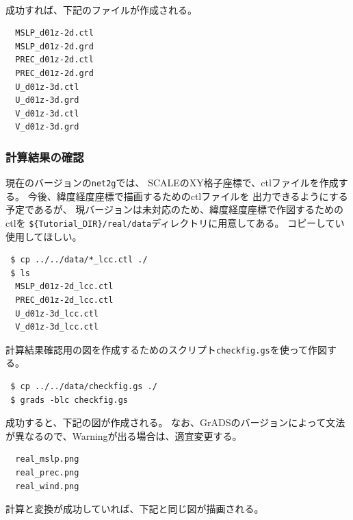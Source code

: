 \\

成功すれば、下記のファイルが作成される。
\begin{verbatim}
  MSLP_d01z-2d.ctl
  MSLP_d01z-2d.grd
  PREC_d01z-2d.ctl
  PREC_d01z-2d.grd
  U_d01z-3d.ctl
  U_d01z-3d.grd
  V_d01z-3d.ctl
  V_d01z-3d.grd
\end{verbatim}


\subsubsection{計算結果の確認}
現在のバージョンの\verb|net2g|では、
SCALEのXY格子座標で、ctlファイルを作成する。
今後、緯度経度座標で描画するためのctlファイルを
出力できるようにする予定であるが、
現バージョンは未対応のため、緯度経度座標で作図するためのctlを
\verb|${Tutorial_DIR}/real/data|ディレクトリに用意してある。
コピーしてい使用してほしい。
\begin{verbatim}
 $ cp ../../data/*_lcc.ctl ./
 $ ls
  MSLP_d01z-2d_lcc.ctl
  PREC_d01z-2d_lcc.ctl
  U_d01z-3d_lcc.ctl
  V_d01z-3d_lcc.ctl
\end{verbatim}

計算結果確認用の図を作成するためのスクリプト\verb|checkfig.gs|を使って作図する。
\begin{verbatim}
 $ cp ../../data/checkfig.gs ./
 $ grads -blc checkfig.gs
\end{verbatim}
成功すると、下記の図が作成される。
なお、GrADSのバージョンによって文法が異なるので、Warningが出る場合は、適宜変更する。
\begin{verbatim}
  real_mslp.png
  real_prec.png
  real_wind.png
\end{verbatim}
計算と変換が成功していれば、下記と同じ図が描画される。

